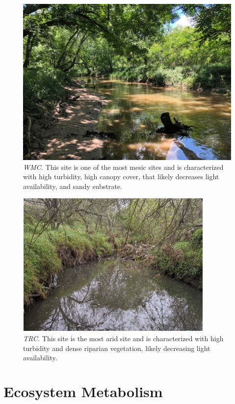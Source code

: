 \begin{figure}[htb]
\begin{center}
\includegraphics[scale = 0.8]{Figs/WMC.jpg}
\caption[WMC]{\textit{WMC.} This site is one of the most mesic sites and is characterized with high turbidity, high canopy cover, that likely decreases light availability, and sandy substrate.}
\label{Pic:WMC}
\end{center}
\end{figure}

\begin{figure}[htb]
\begin{center}
\includegraphics[scale = 0.8]{Figs/trc.jpg}
\caption[TRC]{\textit{TRC.} This site is the most arid site and is characterized with high turbidity and dense riparian vegetation, likely decreasing light availability.}
\label{Pic:TRC}
\end{center}
\end{figure}


\section{Ecosystem Metabolism}

